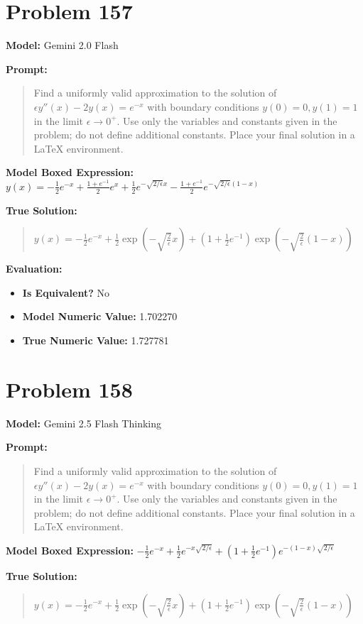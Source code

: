 \documentclass{article}
\begin{document}
{\section*{Problem 157}
\textbf{Model:} Gemini 2.0 Flash

\textbf{Prompt:}
\begin{quote}
Find a uniformly valid approximation to the solution of $\epsilon y''(x) - 2y(x) = e^{-x}$ with boundary conditions $y(0)=0, y(1)=1$ in the limit $\epsilon \to 0^+$. Use only the variables and constants given in the problem; do not define additional constants. Place your final solution in a $\boxed{}$ LaTeX environment.
\end{quote}
\textbf{Model Boxed Expression:} $y(x) = -\frac{1}{2}e^{-x} + \frac{1+e^{-1}}{2}e^{x} + \frac{1}{2}e^{-\sqrt{2/\epsilon}x} - \frac{1+e^{-1}}{2}e^{-\sqrt{2/\epsilon}(1-x)}$

\textbf{True Solution:}
\begin{quote}
$y(x) = -\frac{1}{2} e^{-x} + \frac{1}{2} \exp\left(-\sqrt{\frac{2}{\epsilon}}x\right) + \left(1 + \frac{1}{2} e^{-1}\right) \exp\left(-\sqrt{\frac{2}{\epsilon}}(1-x)\right)$
\end{quote}

\textbf{Evaluation:}
\begin{itemize}
\item \textbf{Is Equivalent?} No
\item \textbf{Model Numeric Value:} 1.702270
\item \textbf{True Numeric Value:} 1.727781
\end{itemize}
\vspace{1cm}
\section*{Problem 158}
\textbf{Model:} Gemini 2.5 Flash Thinking

\textbf{Prompt:}
\begin{quote}
Find a uniformly valid approximation to the solution of $\epsilon y''(x) - 2y(x) = e^{-x}$ with boundary conditions $y(0)=0, y(1)=1$ in the limit $\epsilon \to 0^+$. Use only the variables and constants given in the problem; do not define additional constants. Place your final solution in a $\boxed{}$ LaTeX environment.
\end{quote}
\textbf{Model Boxed Expression:} $-\frac{1}{2}e^{-x} + \frac{1}{2}e^{-x\sqrt{2/\epsilon}} + \left(1 + \frac{1}{2}e^{-1}\right)e^{-(1-x)\sqrt{2/\epsilon}}$

\textbf{True Solution:}
\begin{quote}
$y(x) = -\frac{1}{2} e^{-x} + \frac{1}{2} \exp\left(-\sqrt{\frac{2}{\epsilon}}x\right) + \left(1 + \frac{1}{2} e^{-1}\right) \exp\left(-\sqrt{\frac{2}{\epsilon}}(1-x)\right)$
\end{quote}

}
\end{document}
